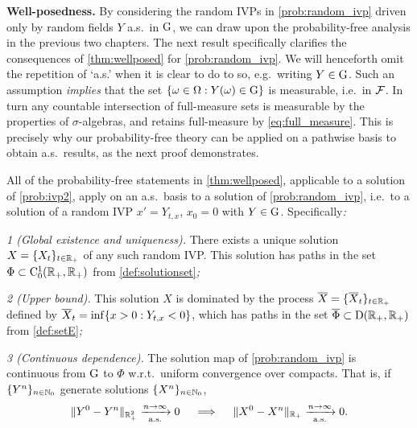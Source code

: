 \vspace{3mm}\textbf{Well-posedness.} By considering the random IVPs in \autoref{prob:random_ivp} driven only by random fields $Y$ a.s.~in $\mathrm{G}$, we can draw upon the probability-free analysis in the previous two chapters. The next result specifically clarifies the consequences of \autoref{thm:wellposed} for \autoref{prob:random_ivp}. We will henceforth omit the repetition of `a.s.' when it is clear to do to so, e.g.~writing $Y\in\mathrm{G}$. Such an assumption \emph{implies} that the set $\{\omega\in\Omega:Y(\omega)\in\mathrm{G}\}$ is measurable, i.e.~in $\mathcal{F}$. In turn any countable intersection of full-measure sets is measurable by the properties of $\sigma$-algebras, and retains full-measure by \autoref{eq:full_measure}. This is precisely why our probability-free theory can be applied on a pathwise basis to obtain a.s.~results, as the next proof demonstrates.
\begin{theorem}\label{thm:rand_well_posed}
    All of the probability-free statements in \autoref{thm:wellposed}, applicable to a solution of \autoref{prob:ivp2}, apply on an a.s.~basis to a solution of \autoref{prob:random_ivp}, i.e.~to a solution of a random IVP $x'=Y_{t,x}$, $x_0=0$ with $Y\in\mathrm{G}$. Specifically\emph{:}

    \emph{1 (Global existence and uniqueness).} There exists a unique solution $X=\{X_t\}_{t\in\mathbb{R}_+}$ of any such random IVP. This solution has paths in the set $\Phi\subset\mathrm{C}^1_0(\mathbb{R}_+,\mathbb{R}_+)$ from \autoref{def:solutionset}\emph{;}

    \emph{2 (Upper bound).} This solution $X$ is dominated by the process ${\overline{X}}=\{{\overline{X}}_t\}_{t\in\mathbb{R}_+}$ defined by ${\overline{X}}_t=\inf\{x>0:Y_{t,x}<0\}$, which has paths in the set $\overline{\Phi}\subset\mathrm{D}(\mathbb{R}_+,\mathbb{R}_+)$ from \autoref{def:setE}\emph{;}

    \emph{3 (Continuous dependence).}$\!$ The solution map of \autoref{prob:random_ivp} is continuous from $\mathrm{G}$ to $\Phi$ w.r.t.~uniform convergence over compacts. That is, if $\{Y^n\}_{n\in\mathbb{N}_0}$ generate solutions $\{X^n\}_{n\in\mathbb{N}_0}$,~
    \begin{equation}\label{eq:cont_dep_sim}
        \Vert Y^0-Y^n\Vert_{\mathbb{R}_+^2}\xrightarrow[\mathrm{a.s.}]{n\to\infty}0\quad \implies\quad \Vert X^0- X^n\Vert_{\mathbb{R}_+}\xrightarrow[\mathrm{a.s.}]{n\to\infty}0.
    \end{equation}
\end{theorem}
